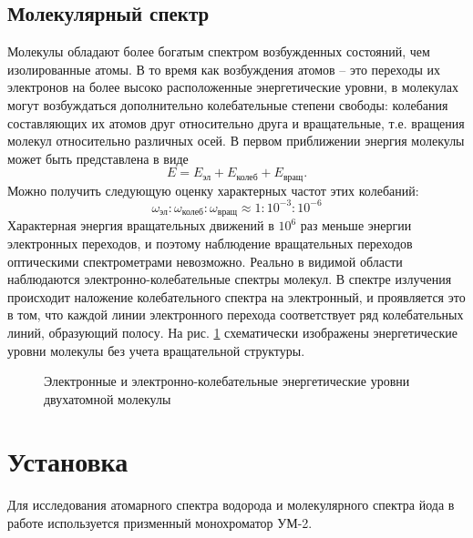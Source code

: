 \documentclass[12pt,a4paper]{article}
\begin{document}
\subsection{Молекулярный спектр}
Молекулы обладают более богатым спектром возбужденных состояний, чем изолированные атомы. В то время как возбуждения атомов -- это переходы их электронов на более высоко расположенные энергетические уровни, в молекулах могут возбуждаться дополнительно колебательные степени свободы: колебания составляющих их атомов друг относительно друга и вращательные, т.е. вращения молекул относительно различных осей. В первом приближении энергия молекулы может быть представлена в виде 
\begin{equation}
E = E_\text{эл} + E_\text{колеб} + E_\text{вращ}.
\end{equation}
Можно получить следующую оценку характерных частот этих колебаний:
\begin{equation}
\omega_\text{эл} : \omega_\text{колеб} : \omega_\text{вращ} \approx 1 : 10^{-3} : 10^{-6}
\end{equation}
Характерная энергия вращательных движений в $10^6$ раз меньше энергии электронных переходов, и поэтому наблюдение вращательных переходов оптическими спектрометрами невозможно. Реально в видимой области наблюдаются электронно-колебательные спектры молекул. В спектре излучения происходит наложение колебательного спектра на электронный, и проявляется это в том, что каждой линии электронного перехода соответствует ряд колебательных линий, образующий полосу. На рис. \ref{levels} схематически изображены энергетические уровни молекулы без учета вращательной структуры.


\begin{figure}[ht!]\label{levels} 
\caption{Электронные и электронно-колебательные энергетические уровни двухатомной молекулы}
\end{figure}

\newpage

\section{Установка}
Для исследования атомарного спектра водорода и молекулярного спектра йода в работе используется призменный монохроматор УМ-2.
\end{document}
